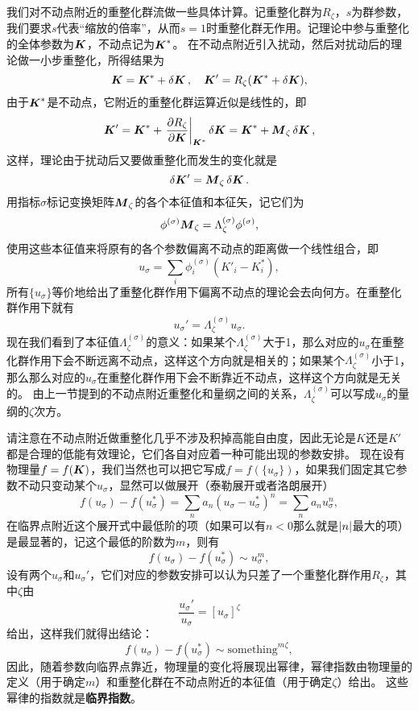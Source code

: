 \documentclass[hyperref, UTF8, a4paper]{ctexart}
\begin{document}
我们对不动点附近的重整化群流做一些具体计算。记重整化群为$R_\zeta$，$s$为群参数，我们要求$s$代表“缩放的倍率”，从而$s=1$时重整化群无作用。记理论中参与重整化的全体参数为$\vb*{K}$，不动点记为$\vb*{K}^*$。
在不动点附近引入扰动，然后对扰动后的理论做一小步重整化，所得结果为
\[
    \vb*{K} = \vb*{K}^* + \var{\vb*{K}} , \quad \vb*{K}' = R_\zeta(\vb*{K}^* + \var{\vb*{K}}),
\]
由于$\vb*{K}^*$是不动点，它附近的重整化群运算近似是线性的，即
\[
    \vb*{K}' = \vb*{K}^* + \eval{\pdv{R_\zeta}{\vb*{K}}}_{\vb*{K}^*} \var{\vb*{K}} = \vb*{K}^* + \vb*{M}_\zeta \var{\vb*{K}},
\]
这样，理论由于扰动后又要做重整化而发生的变化就是
\[
    \var{\vb*{K}'} = \vb*{M}_\zeta \var{\vb*{K}}.
\]
用指标$\sigma$标记变换矩阵$\vb*{M}_\zeta$的各个本征值和本征矢，记它们为
\[
    \phi^{(\sigma)} \vb*{M}_\zeta = \Lambda^{(\sigma)}_\zeta \phi^{(\sigma)},
\]
使用这些本征值来将原有的各个参数偏离不动点的距离做一个线性组合，即
\[
    u_\sigma = \sum_i \phi^{(\sigma)}_i (K'_i - K^*_i), 
\]
所有$\{u_\sigma\}$等价地给出了重整化群作用下偏离不动点的理论会去向何方。在重整化群作用下就有
\[
    u_\sigma' = \Lambda^{(\sigma)}_\zeta u_\sigma.
\]
现在我们看到了本征值$\Lambda_\zeta^{(\sigma)}$的意义：如果某个$\Lambda_\zeta^{(\sigma)}$大于1，那么对应的$u_\sigma$在重整化群作用下会不断远离不动点，这样这个方向就是相关的；如果某个$\Lambda_\zeta^{(\sigma)}$小于1，那么那么对应的$u_\sigma$在重整化群作用下会不断靠近不动点，这样这个方向就是无关的。
由上一节提到的不动点附近重整化和量纲之间的关系，$\Lambda_\zeta^{(\sigma)}$可以写成$u_\sigma$的量纲的$\zeta$次方。

请注意在不动点附近做重整化几乎不涉及积掉高能自由度，因此无论是$K$还是$K'$都是合理的低能有效理论，它们各自对应着一种可能出现的参数安排。
现在设有物理量$f = f(\vb*{K})$，我们当然也可以把它写成$f=f(\{u_\sigma\})$，如果我们固定其它参数不动只变动某个$u_\sigma$，显然可以做展开（泰勒展开或者洛朗展开）
\[
    f(u_\sigma) - f(u_\sigma^*) = \sum_n a_n (u_\sigma - u_\sigma^*)^n = \sum_n a_n u_\sigma^n,
\]
在临界点附近这个展开式中最低阶的项（如果可以有$n<0$那么就是$\abs{n}$最大的项）是最显著的，记这个最低的阶数为$m$，则有
\[
    f(u_\sigma) - f(u_\sigma^*) \sim u_\sigma^m,
\]
设有两个$u_\sigma$和$u_\sigma'$，它们对应的参数安排可以认为只差了一个重整化群作用$R_\zeta$，其中$\zeta$由
\[
    \frac{u_\sigma'}{u_\sigma} = [u_\sigma]^\zeta
\]
给出，这样我们就得出结论：
\[
    f(u_\sigma) - f(u_\sigma^*) \sim \text{something}^{m \zeta},
\]
因此，随着参数向临界点靠近，物理量的变化将展现出幂律，幂律指数由物理量的定义（用于确定$m$）和重整化群在不动点附近的本征值（用于确定$\zeta$）给出。
这些幂律的指数就是\textbf{临界指数}。
\end{document}
